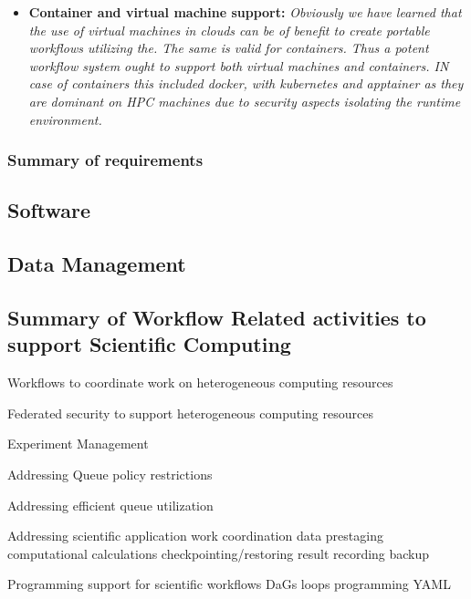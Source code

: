 \documentclass[utf8]{FrontiersinVancouver} %
\begin{document}
\begin{tcolorbox}[breakable]
\begin{itemize}
{     integrated in the scientific reserach and benchmark efforts.}
 \item {\bf Container and virtual machine support:} {\it Obviously we
     have learned that the use of virtual machines in clouds can be of
     benefit to create portable workflows utilizing the. The same is
     valid for containers. Thus a potent workflow system ought to
     support both virtual machines and containers. IN case of
     containers this included docker, with kubernetes and apptainer as
     they are dominant on HPC machines due to security aspects
     isolating the runtime environment. }
  \end{itemize}
\end{tcolorbox}



\subsubsection{Summary of requirements}



\subsection{Software}

\subsection{Data Management}


\subsection{Summary of Workflow Related activities to support Scientific Computing}

Workflows to coordinate work on heterogeneous computing resources

Federated security to support heterogeneous computing resources

Experiment Management

Addressing  Queue policy restrictions

Addressing efficient queue utilization

Addressing scientific application work coordination
    data prestaging
    computational calculations
    checkpointing/restoring
    result recording
    backup

Programming support for scientific workflows
    DaGs
    loops
    programming
    YAML
    
\end{document}
